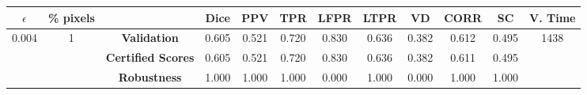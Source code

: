 \begin{longtable}{ c  c | c | c  c  c  c  c  c  c c c}
\toprule \textbf{$\epsilon$} & \textbf{\% pixels} & & \textbf{Dice} & \textbf{PPV} & \textbf{TPR} & \textbf{LFPR} & \textbf{LTPR} & \textbf{VD} & \textbf{CORR} & \textbf{SC} & \textbf{V. Time} \\
\midrule 
\multirow{3}{*}{0.004}  & \multirow{3}{*}{1} &\textbf{Validation} & 0.605 & 0.521 & 0.720 & 0.830 & 0.636 & 0.382 & 0.612 & 0.495 & \multirow{3}{*}{1438} \\
 & & \textbf{Certified Scores} & 0.605 & 0.521 & 0.720 & 0.830 & 0.636 & 0.382 & 0.611 & 0.495 & \\
& & \textbf{Robustness} & 1.000 & 1.000 & 1.000 & 0.000 & 1.000 & 0.000 & 1.000 & 1.000 & \\
\end{longtable}